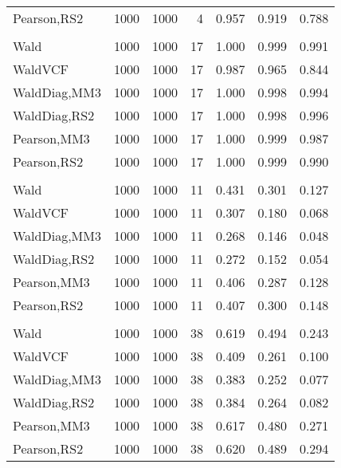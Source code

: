 \documentclass[
]{article}
\begin{document}
\begin{table}[H]
{\begin{tabular}[t]{lrrrrrr}
\hspace{1em}Pearson,RS2 & 1000 & 1000 & 4 & 0.957 & 0.919 & 0.788\\
\addlinespace[0.3em]
\multicolumn{7}{l}{\textbf{1F 15V}}\\
\hspace{1em}Wald & 1000 & 1000 & 17 & 1.000 & 0.999 & 0.991\\
\hspace{1em}WaldVCF & 1000 & 1000 & 17 & 0.987 & 0.965 & 0.844\\
\hspace{1em}WaldDiag,MM3 & 1000 & 1000 & 17 & 1.000 & 0.998 & 0.994\\
\hspace{1em}WaldDiag,RS2 & 1000 & 1000 & 17 & 1.000 & 0.998 & 0.996\\
\hspace{1em}Pearson,MM3 & 1000 & 1000 & 17 & 1.000 & 0.999 & 0.987\\
\hspace{1em}Pearson,RS2 & 1000 & 1000 & 17 & 1.000 & 0.999 & 0.990\\
\addlinespace[0.3em]
\multicolumn{7}{l}{\textbf{2F 10V}}\\
\hspace{1em}Wald & 1000 & 1000 & 11 & 0.431 & 0.301 & 0.127\\
\hspace{1em}WaldVCF & 1000 & 1000 & 11 & 0.307 & 0.180 & 0.068\\
\hspace{1em}WaldDiag,MM3 & 1000 & 1000 & 11 & 0.268 & 0.146 & 0.048\\
\hspace{1em}WaldDiag,RS2 & 1000 & 1000 & 11 & 0.272 & 0.152 & 0.054\\
\hspace{1em}Pearson,MM3 & 1000 & 1000 & 11 & 0.406 & 0.287 & 0.128\\
\hspace{1em}Pearson,RS2 & 1000 & 1000 & 11 & 0.407 & 0.300 & 0.148\\
\addlinespace[0.3em]
\multicolumn{7}{l}{\textbf{3F 15V}}\\
\hspace{1em}Wald & 1000 & 1000 & 38 & 0.619 & 0.494 & 0.243\\
\hspace{1em}WaldVCF & 1000 & 1000 & 38 & 0.409 & 0.261 & 0.100\\
\hspace{1em}WaldDiag,MM3 & 1000 & 1000 & 38 & 0.383 & 0.252 & 0.077\\
\hspace{1em}WaldDiag,RS2 & 1000 & 1000 & 38 & 0.384 & 0.264 & 0.082\\
\hspace{1em}Pearson,MM3 & 1000 & 1000 & 38 & 0.617 & 0.480 & 0.271\\
\hspace{1em}Pearson,RS2 & 1000 & 1000 & 38 & 0.620 & 0.489 & 0.294\\
\bottomrule
\end{tabular}}
\endgroup{}
\end{table}
\end{document}
